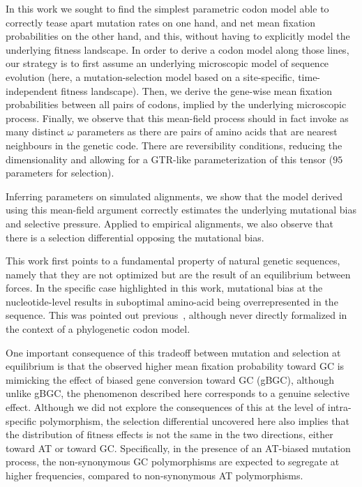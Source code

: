 In this work we sought to find the simplest parametric \gls{codon} model able to correctly tease apart mutation rates on one hand, and net mean fixation probabilities on the other hand, and this, without having to explicitly model the underlying fitness landscape.
In order to derive a \gls{codon} model along those lines, our strategy is to first assume an underlying microscopic model of sequence evolution (here, a mutation-selection model based on a site-specific, time-independent fitness landscape).
Then, we derive the gene-wise mean fixation probabilities between all pairs of \glspl{codon}, implied by the underlying microscopic process.
Finally, we observe that this mean-field process should in fact invoke as many distinct $\omega$ parameters as there are pairs of amino acids that are nearest neighbours in the genetic code.
There are reversibility conditions, reducing the dimensionality and allowing for a GTR-like parameterization of this tensor ($95$ parameters for selection).

Inferring parameters on simulated alignments, we show that the model derived using this mean-field argument correctly estimates the underlying mutational bias and selective pressure.
Applied to empirical alignments, we also observe that there is a selection differential opposing the mutational bias.

This work first points to a fundamental property of natural genetic sequences, namely that they are not optimized but are the result of an equilibrium between forces.
In the specific case highlighted in this work, mutational bias at the nucleotide-level results in suboptimal amino-acid being overrepresented in the sequence.
This was pointed out previous~\citep{Singer2000}, although never directly formalized in the context of a phylogenetic \gls{codon} model.

One important consequence of this tradeoff between mutation and selection at equilibrium is that the observed higher mean fixation probability toward GC is mimicking the effect of biased gene conversion toward GC (\acrshort{gBGC}), although unlike \acrshort{gBGC}, the phenomenon described here corresponds to a genuine selective effect.
Although we did not explore the consequences of this at the level of intra-specific polymorphism, the selection differential uncovered here also implies that the distribution of fitness effects is not the same in the two directions, either toward AT or toward GC.
Specifically, in the presence of an AT-biased mutation process, the \gls{non-synonymous} GC polymorphisms are expected to segregate at higher frequencies, compared to \gls{non-synonymous} AT polymorphisms.

